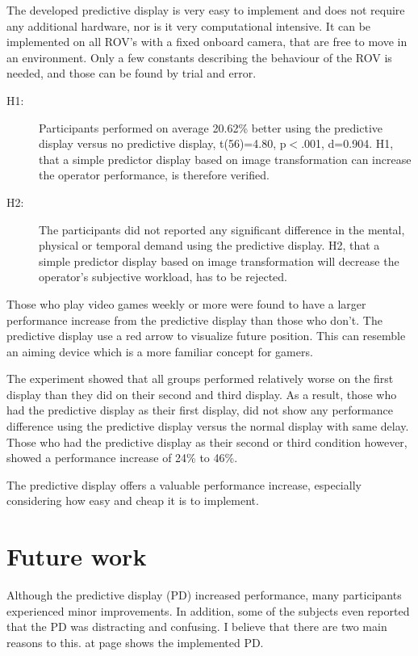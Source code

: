The developed predictive display is very easy to implement and does not require any additional hardware, nor is it very computational intensive. It can be implemented on all ROV's with a fixed onboard camera, that are free to move in an environment. Only a few constants describing the behaviour of the ROV is needed, and those can be found by trial and error.

\begin{description}
\item[H1:] Participants performed on average 20.62\% better using the predictive display versus no predictive display, t(56)=4.80, p$<$.001, d=0.904. H1, that a simple predictor display based on image transformation can increase the operator performance, is therefore verified.

\item[H2:] The participants did not reported any significant difference in the mental, physical or temporal demand using the predictive display. H2, that a simple predictor display based on image transformation will decrease the operator's subjective workload, has to be rejected. 
\end{description}

Those who play video games weekly or more were found to have a larger performance increase from the predictive display than those who don't. The predictive display use a red arrow to visualize future position. This can resemble an aiming device which is a more familiar concept for gamers.

The experiment showed that all groups performed relatively worse on the first display than they did on their second and third display. As a result, those who had the predictive display as their first display, did not show any performance difference using the predictive display versus the normal display with same delay. Those who had the predictive display as their second or third condition however, showed a performance increase of 24\% to 46\%.

The predictive display offers a valuable performance increase, especially considering how easy and cheap it is to implement.

\section{Future work}

Although the predictive display (PD) increased performance, many participants experienced minor improvements. In addition, some of the subjects even reported that the PD was distracting and confusing. I believe that there are two main reasons to this.  at page \pageref{predictorvis} shows the implemented PD.

